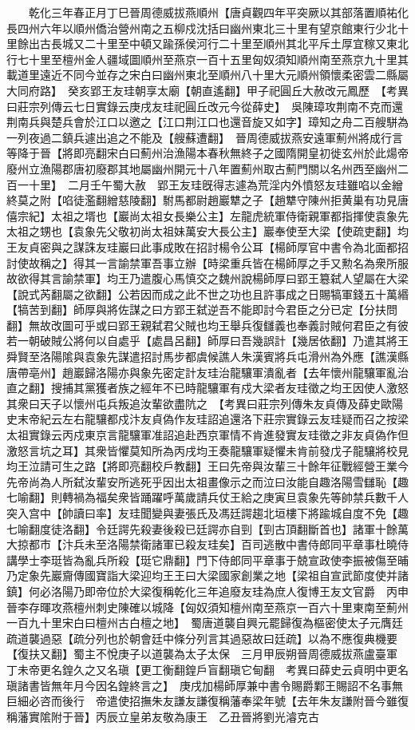 　　乾化三年春正月丁巳晉周德威拔燕順州【唐貞觀四年平突厥以其部落置順祐化長四州六年以順州僑治營州南之五柳戍沈括曰幽州東北三十里有望京館東行少北十里餘出古長城又二十里至中頓又踰孫侯河行二十里至順州其北平斥土厚宜稼又東北行七十里至檀州金人疆域圖順州至燕京一百十五里匈奴須知順州南至燕京九十里其載道里遠近不同今並存之宋白曰幽州東北至順州八十里大元順州領懷柔密雲二縣屬大同府路】　癸亥郢王友珪朝享太廟【朝直遙翻】甲子祀圓丘大赦改元鳳歷　【考異曰莊宗列傳云七日實錄云庚戌友珪祀圓丘改元今從薛史】　吳陳璋攻荆南不克而還荆南兵與楚兵會於江口以邀之【江口荆江口也還音旋又如字】璋知之舟二百艘駢為一列夜過二鎮兵遽出追之不能及【艘蘇遭翻】　晉周德威拔燕安遠軍薊州將成行言等降于晉【將即亮翻宋白曰薊州治漁陽本春秋無終子之國隋開皇初徙玄州於此煬帝廢州立漁陽郡唐初廢郡其地屬幽州開元十八年置薊州取古薊門關以名州西至幽州二百一十里】　二月壬午蜀大赦　郢王友珪旣得志遽為荒淫内外憤怒友珪雖啗以金繒終莫之附【啗徒濫翻繒慈陵翻】駙馬都尉趙巖犨之子【趙犨守陳州拒黄巢有功見唐僖宗紀】太祖之壻也【巖尚太祖女長樂公主】左龍虎統軍侍衛親軍都指揮使袁象先太祖之甥也【袁象先父敬初尚太祖妹萬安大長公主】巖奉使至大梁【使疏吏翻】均王友貞密與之謀誅友珪巖曰此事成敗在招討楊令公耳【楊師厚官中書令為北面都招討使故稱之】得其一言諭禁軍吾事立辦【時梁重兵皆在楊師厚之手又勲名為衆所服故欲得其言諭禁軍】均王乃遣腹心馬慎交之魏州說楊師厚曰郢王簒弑人望屬在大梁【說式芮翻屬之欲翻】公若因而成之此不世之功也且許事成之日賜犒軍錢五十萬緡【犒苦到翻】師厚與將佐謀之曰方郢王弑逆吾不能即討今君臣之分已定【分扶問翻】無故改圖可乎或曰郢王親弑君父賊也均王舉兵復讎義也奉義討賊何君臣之有彼若一朝破賊公將何以自處乎【處昌呂翻】師厚曰吾幾誤計【幾居依翻】乃遣其將王舜賢至洛陽隂與袁象先謀遣招討馬步都虞候譙人朱漢賓將兵屯滑州為外應【譙漢縣唐帶亳州】趙巖歸洛陽亦與象先密定計友珪治龍驤軍潰亂者【去年懷州龍驤軍亂治直之翻】搜捕其黨獲者族之經年不已時龍驤軍有戍大梁者友珪徵之均王因使人激怒其衆曰天子以懷州屯兵叛追汝輩欲盡阬之　【考異曰莊宗列傳朱友貞傳及薛史歐陽史末帝紀云左右龍驤都戍汴友貞偽作友珪詔追還洛下莊宗實錄云友珪疑而召之按梁太祖實錄云丙戍東京言龍驤軍准詔追赴西京軍情不肯進發實友珪徵之非友貞偽作但激怒言坑之耳】其衆皆懼莫知所為丙戌均王奏龍驤軍疑懼未肯前發戊子龍驤將校見均王泣請可生之路【將即亮翻校戶教翻】王曰先帝與汝輩三十餘年征戰經營王業今先帝尚為人所弑汝輩安所逃死乎因出太祖畫像示之而泣曰汝能自趣洛陽雪讎恥【趣七喻翻】則轉禍為福矣衆皆踊躍呼萬歲請兵仗王給之庚寅旦袁象先等帥禁兵數千人突入宫中【帥讀曰率】友珪聞變與妻張氏及馮廷諤趨北垣樓下將踰城自度不免【趣七喻翻度徒洛翻】令廷諤先殺妻後殺已廷諤亦自剄【剄古頂翻斷首也】諸軍十餘萬大掠都市【汴兵未至洛陽禁衛諸軍已殺友珪矣】百司逃散中書侍郎同平章事杜曉侍講學士李珽皆為亂兵所殺【珽它鼎翻】門下侍郎同平章事于兢宣政使李振被傷至晡乃定象先巖齎傳國寶詣大梁迎均王王曰大梁國家創業之地【梁祖自宣武節度使并諸鎮】何必洛陽乃即帝位於大梁復稱乾化三年追廢友珪為庶人復博王友文官爵　丙申晉李存暉攻燕檀州刺史陳確以城降【匈奴須知檀州南至燕京一百六十里東南至薊州一百九十里宋白曰檀州古白檀之地】　蜀唐道襲自興元罷歸復為樞密使太子元膺廷疏道襲過惡【疏分列也於朝會廷中條分列言其過惡故曰廷疏】以為不應復典機要【復扶又翻】蜀主不悅庚子以道襲為太子太保　三月甲辰朔晉周德威拔燕盧臺軍　丁未帝更名鍠久之又名瑱【更工衡翻鍠戶盲翻瑱它甸翻　考異曰薛史云貞明中更名瑱諸書皆無年月今因名鍠終言之】　庚戌加楊師厚兼中書令賜爵鄴王賜詔不名事無巨細必咨而後行　帝遣使招撫朱友謙友謙復稱藩奉梁年號【去年朱友謙附晉今雖復稱藩實隂附于晉】丙辰立皇弟友敬為康王　乙丑晉將劉光濬克古

